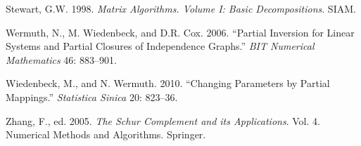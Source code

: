 \documentclass[12pt,]{article}
\begin{document}
\hypertarget{ref-stewart_98}{}
Stewart, G.W. 1998. \emph{Matrix Algorithms. Volume I: Basic
Decompositions}. SIAM.

\hypertarget{ref-wermuth_wiedenbeck_cox_06}{}
Wermuth, N., M. Wiedenbeck, and D.R. Cox. 2006. ``Partial Inversion for
Linear Systems and Partial Closures of Independence Graphs.'' \emph{BIT
Numerical Mathematics} 46: 883--901.

\hypertarget{ref-wiedenbeck_wermuth_10}{}
Wiedenbeck, M., and N. Wermuth. 2010. ``Changing Parameters by Partial
Mappings.'' \emph{Statistica Sinica} 20: 823--36.

\hypertarget{ref-zhang_05}{}
Zhang, F., ed. 2005. \emph{The Schur Complement and its Applications}.
Vol. 4. Numerical Methods and Algorithms. Springer.
\end{document}
